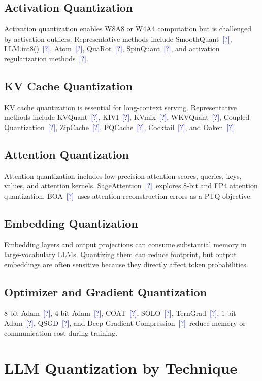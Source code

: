 \documentclass[journal,10pt]{IEEEtran}
\newcommand{\CITE}{\textcolor{blue}{[?]}}
\begin{document}
\subsection{Activation Quantization}
Activation quantization enables W8A8 or W4A4 computation but is challenged by activation outliers. Representative methods include SmoothQuant~\CITE, LLM.int8()~\CITE, Atom~\CITE, QuaRot~\CITE, SpinQuant~\CITE, and activation regularization methods~\CITE.

\subsection{KV Cache Quantization}
KV cache quantization is essential for long-context serving. Representative methods include KVQuant~\CITE, KIVI~\CITE, KVmix~\CITE, WKVQuant~\CITE, Coupled Quantization~\CITE, ZipCache~\CITE, PQCache~\CITE, Cocktail~\CITE, and Oaken~\CITE.

\subsection{Attention Quantization}
Attention quantization includes low-precision attention scores, queries, keys, values, and attention kernels. SageAttention~\CITE\ explores 8-bit and FP4 attention quantization. BOA~\CITE\ uses attention reconstruction errors as a PTQ objective.

\subsection{Embedding Quantization}
Embedding layers and output projections can consume substantial memory in large-vocabulary LLMs. Quantizing them can reduce footprint, but output embeddings are often sensitive because they directly affect token probabilities.

\subsection{Optimizer and Gradient Quantization}
8-bit Adam~\CITE, 4-bit Adam~\CITE, COAT~\CITE, SOLO~\CITE, TernGrad~\CITE, 1-bit Adam~\CITE, QSGD~\CITE, and Deep Gradient Compression~\CITE\ reduce memory or communication cost during training.

\section{LLM Quantization by Technique}
\end{document}
